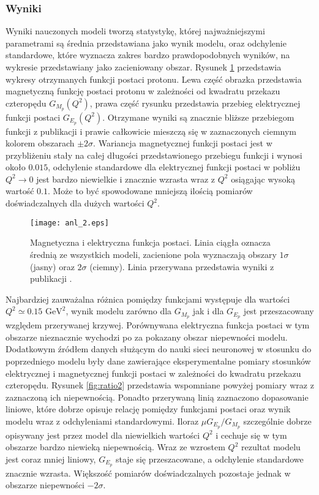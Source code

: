 \documentclass[11pt]{book}
\theoremstyle{definition}
\begin{document}
\subsubsection{Wyniki}
%
Wyniki nauczonych modeli tworzą statystykę, której najważniejszymi parametrami są średnia przedstawiana jako wynik modelu, oraz odchylenie standardowe, które wyznacza zakres bardzo prawdopodobnych wyników, na wykresie przedstawiany jako zacieniowany obszar. Rysunek \ref{fig:ff2} przedstawia wykresy otrzymanych funkcji postaci protonu. Lewa część obrazka przedstawia magnetyczną funkcję postaci protonu w zależności od kwadratu przekazu czteropędu $G_{M_p}\left(Q^2\right)$, prawa część rysunku przedstawia przebieg elektrycznej funkcji postaci $G_{E_p}\left(Q^2\right)$. Otrzymane wyniki są znacznie bliższe przebiegom funkcji z publikacji \cite{2009PhRvC..79f5204A} i prawie całkowicie mieszczą się w zaznaczonych ciemnym kolorem obszarach $\pm 2\sigma$. Wariancja magnetycznej funkcji postaci jest w przybliżeniu stały na całej długości przedstawionego przebiegu funkcji i wynosi około $0.015$, odchylenie standardowe dla elektrycznej funkcji postaci w pobliżu $Q^2 \rightarrow 0$ jest bardzo niewielkie i znacznie wzrasta wraz z $Q^2$ osiągając wysoką wartość $0.1$. Może to być spowodowane mniejszą ilością pomiarów doświadczalnych dla dużych wartości $Q^2$.
% 
\begin{figure}[hp!]
	\centering
	\texttt{[image: anl\_2.eps]}
	\caption{Magnetyczna i elektryczna funkcja postaci. Linia ciągła oznacza średnią ze wszystkich modeli, zacienione pola wyznaczają obszary $1 \sigma$ (jasny) oraz $2\sigma$ (ciemny). Linia przerywana przedstawia wyniki z publikacji \cite{2009PhRvC..79f5204A}. } 
	\label{fig:ff2}
\end{figure}
% 
Najbardziej zauważalna różnica pomiędzy funkcjami występuje dla wartości $Q^2 \simeq 0.15 \text{ GeV}^2$, wynik modelu zarówno dla $G_{M_p}$ jak i dla $G_{E_p}$ jest przeszacowany względem przerywanej krzywej. Porównywana elektryczna funkcja postaci w tym obszarze nieznacznie wychodzi po za pokazany obszar niepewności modelu. 
Dodatkowym źródłem danych służącym do nauki sieci neuronowej w stosunku do poprzedniego modelu były dane zawierające eksperymentalne pomiary stosunków elektrycznej i magnetycznej funkcji postaci w zależności do kwadratu przekazu czteropędu. Rysunek \ref{fig:ratio2} przedstawia wspomniane powyżej pomiary wraz z zaznaczoną ich niepewnością. Ponadto przerywaną linią zaznaczono dopasowanie liniowe, które dobrze opisuje relację pomiędzy funkcjami postaci oraz wynik modelu wraz z odchyleniami standardowymi. Iloraz $\mu G_{E_p} / G_{M_p}$ szczególnie dobrze opisywany jest przez model dla niewielkich wartości $Q^2$ i cechuje się w tym obszarze bardzo niewieką niepewnością. Wraz ze wzrostem $Q^2$ rezultat modelu jest coraz mniej liniowy, $G_{E_p}$ staje się przeszacowane, a odchylenie standardowe znacznie wzrasta. Większość pomiarów doświadczalnych pozostaje jednak w obszarze niepewności $-2\sigma$.
\end{document}
